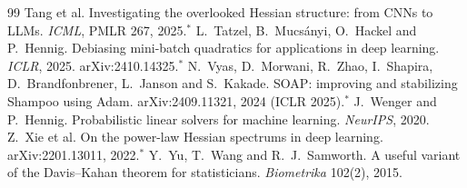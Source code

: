 \documentclass[11pt,a4paper]{article}
\theoremstyle{plain}
\theoremstyle{definition}
\theoremstyle{remark}
\begin{document}
\begin{thebibliography}{99}
 Tang et al. Investigating the overlooked Hessian structure: from CNNs to LLMs. \emph{ICML}, PMLR 267,
  2025.$^*$
 L.~Tatzel, B.~Mucs\'anyi, O.~Hackel and P.~Hennig. Debiasing mini-batch quadratics for applications
  in deep learning. \emph{ICLR}, 2025. arXiv:2410.14325.$^*$
 N.~Vyas, D.~Morwani, R.~Zhao, I.~Shapira, D.~Brandfonbrener, L.~Janson and S.~Kakade. SOAP: improving
  and stabilizing Shampoo using Adam. arXiv:2409.11321, 2024 (ICLR 2025).$^*$
 J.~Wenger and P.~Hennig. Probabilistic linear solvers for machine learning. \emph{NeurIPS}, 2020.
 Z.~Xie et al. On the power-law Hessian spectrums in deep learning. arXiv:2201.13011, 2022.$^*$
 Y.~Yu, T.~Wang and R.~J.~Samworth. A useful variant of the Davis--Kahan theorem for statisticians.
  \emph{Biometrika} 102(2), 2015.
\end{thebibliography}
\end{document}
